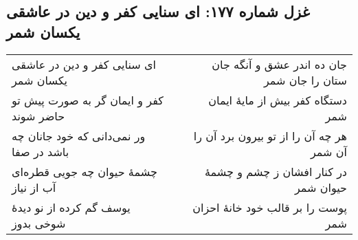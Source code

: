 \begin{center}
\section*{غزل شماره ۱۷۷: ای سنایی کفر و دین در عاشقی یکسان شمر}
\label{sec:177}
\begin{longtable}{l p{0.5cm} r}
ای سنایی کفر و دین در عاشقی یکسان شمر
&&
جان ده اندر عشق و آنگه جان ستان را جان شمر
\\
کفر و ایمان گر به صورت پیش تو حاضر شوند
&&
دستگاه کفر بیش از مایهٔ ایمان شمر
\\
ور نمی‌دانی که خود جانان چه باشد در صفا
&&
هر چه آن را از تو بیرون برد آن را آن شمر
\\
چشمهٔ حیوان چه جویی قطره‌ای آب از نیاز
&&
در کنار افشان ز چشم و چشمهٔ حیوان شمر
\\
یوسف گم کرده از نو دیدهٔ شوخی بدوز
&&
پوست را بر قالب خود خانهٔ احزان شمر
\\
\end{longtable}
\end{center}
